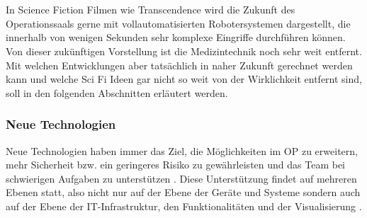 \chapter{}
\label{sec:overview}

In Science Fiction Filmen wie Transcendence wird die Zukunft des Operationssaals gerne mit vollautomatisierten Robotersystemen dargestellt, die innerhalb von wenigen Sekunden sehr komplexe Eingriffe durchführen können. 
Von dieser zukünftigen Vorstellung ist die Medizintechnik noch sehr weit entfernt. Mit welchen Entwicklungen aber tatsächlich in naher Zukunft gerechnet werden kann und welche Sci Fi Ideen gar nicht so weit von der Wirklichkeit entfernt sind, soll in den folgenden Abschnitten erläutert werden.


\subsection{Neue Technologien}
Neue Technologien haben immer das Ziel, die Möglichkeiten im OP zu erweitern, mehr Sicherheit bzw. ein geringeres Risiko zu gewährleisten und das Team bei schwierigen Aufgaben zu unterstützen \cite{CurrentAndFuture}. Diese Unterstützung findet auf mehreren Ebenen statt, also nicht nur auf der Ebene der Geräte und Systeme sondern auch auf der Ebene der IT-Infrastruktur, den Funktionalitäten und der Visualisierung \cite{DerDigitaleOperationssaal}.

